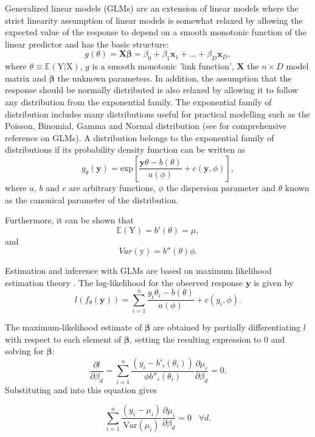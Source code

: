 \documentclass[]{book}
\begin{document}
Generalized linear models (GLMs) \citep{nelder_generalized_1972} are an
extension of linear models where the strict linearity assumption of
linear models is somewhat relaxed by allowing the expected value of the
response to depend on a smooth monotonic function of the linear
predictor and has the basic structure:
\[g(\theta) = \mathbf{X}\boldsymbol{\beta} = \beta_0 + \beta_1\boldsymbol{x}_1 + \dots + \beta_D\boldsymbol{x}_D,\]
where \(\theta \equiv \mathbb{E}(\mathrm{Y}|\mathrm{X})\), \(g\) is a smooth monotonic
'link function', \(\mathbf{X}\) the \(n \times D\) model matrix and \(\boldsymbol{\beta}\) the
unknown parameters. In addition, the assumption that the response should
be normally distributed is also relaxed by allowing it to follow any
distribution from the exponential family. The exponential family of
distribution includes many distributions useful for practical modelling
such as the Poisson, Binomial, Gamma and Normal distribution (see
\citep{mc_cullagh_generalized_1989} for comprehensive reference on GLMs). A
distribution belongs to the exponential family of distributions if its
probability density function can be written as
\[g_{\theta}(\mathbf{y}) = \text{exp} \left[ \dfrac{\mathbf{y}\theta - b(\theta)}{a(\phi)} + c(\mathbf{y},\phi) \right],\]
where \(a\), \(b\) and \(c\) are arbitrary functions, \(\phi\) the dispersion
parameter and \(\theta\) known as the canonical parameter of the
distribution.

Furthermore, it can be shown that \[\mathbb{E}(\mathrm{Y}) = b'(\theta) = \mu,
\label{eq:mu}\] and \[Var(\mathrm{y}) = b''(\theta)\phi.
\label{eq:var}\]

Estimation and inference with GLMs are based on maximum likelihood
estimation theory \citep{ra1922mathematical}. The log-likelihood for the
observed response \(\mathbf{y}\) is given by
\[l(f_{\theta}(\mathbf{y})) = \sum_{i=1}^n \dfrac{y_i\theta_i - b(\theta)}{a(\phi)} + c(y_i,\phi).\]

The maximum-likelihood estimate of \(\boldsymbol{\beta}\) are obtained by partially
differentiating \(l\) with respect to each element of \(\boldsymbol{\beta}\), setting
the resulting expression to 0 and solving for \(\boldsymbol{\beta}\):
\[\dfrac{\partial l}{\partial \beta_d} = \sum_{i=1}^n \dfrac{(y_i - b'_i(\theta_i))}{\phi b''_i(\theta_i)} \dfrac{\partial \mu_i}{\partial \beta_d} = 0.\]
Substituting and into this equation gives

\begin{equation}
\sum_{i=1}^n \dfrac{(y_i - \mu_i)}{\text{Var}(\mu_i)} \dfrac{\partial \mu_i}{\partial \beta_d} = 0 \hspace{10pt} \forall d.
\label{eq:scores}
\end{equation}
\end{document}
